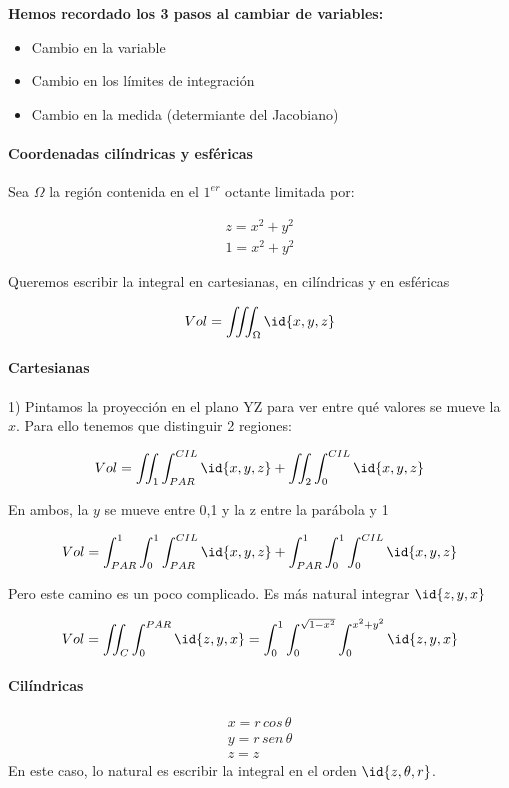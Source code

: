 \textbf{Hemos recordado los 3 pasos al cambiar de variables:}
\begin{itemize}
\item Cambio en la variable
\item Cambio en los límites de integración
\item Cambio en la medida (determiante del Jacobiano)
\end{itemize}


\paragraph{Coordenadas cilíndricas y esféricas}

Sea $\Omega$ la región contenida en el $1^{er}$ octante limitada por:

\begin{gather*}
z=x^2+y^2\\
1=x^2+y^2
\end{gather*}

Queremos escribir la integral en cartesianas, en cilíndricas y en esféricas

\[Vol = \iiint_{\Omega} \id{x,y,z}\]


\paragraph{Cartesianas}
1) Pintamos la proyección en el plano YZ para ver entre qué valores se mueve la $x$. Para ello tenemos que distinguir 2 regiones:


\[Vol = \iint_{1} \int_{PAR}^{CIL} \id{x,y,z} + \iint_2 \int_0^{CIL} \id{x,y,z}\]

En ambos, la $y$ se mueve entre 0,1 y la z entre la parábola y 1


\[Vol = \int_{PAR}^1\int_0^1 \int_{PAR}^{CIL} \id{x,y,z} + \int_{PAR}^1\int_0^1 \int_0^{CIL} \id{x,y,z}\]


Pero este camino es un poco complicado. Es más natural integrar $\id{z,y,x}$

\[Vol = \iint_C \int_0^{PAR} \id{z,y,x} = \int_0^1 \int_0^{\sqrt{1-x^2}} \int_0^{x^2+y^2}\id{z,y,x}\]

\paragraph{Cilíndricas}

\begin{gather*}
x=r\,cos\,\theta\\
y=r\,sen\,\theta\\
z=z
\end{gather*}
En este caso, lo natural es escribir la integral en el orden $\id{z,\theta,r}$.

